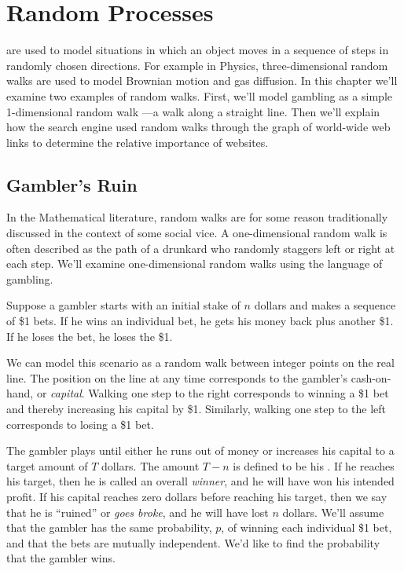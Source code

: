 \chapter{Random Processes}\label{ran_process_chap}

 are used to model situations in which an object moves
in a sequence of steps in randomly chosen directions.  For example in
Physics, three-dimensional random walks are used to model Brownian motion
and gas diffusion.  In this chapter we'll examine two examples of random
walks.  First, we'll model gambling as a simple 1-dimensional random walk
---a walk along a straight line.  Then we'll explain how the 
search engine used random walks through the graph of world-wide web links
to determine the relative importance of websites.

\section{Gambler's Ruin}

\begin{editingnotes}
In the Mathematical literature, random walks are for some reason
traditionally discussed in the context of some social vice.  A
one-dimensional random walk is often described as the path of a drunkard
who randomly staggers left or right at each step.  We'll examine
one-dimensional random walks using the language of gambling.
\end{editingnotes}

Suppose a gambler starts with an initial stake of $n$ dollars and
makes a sequence of \$1 bets.  If he wins an individual bet, he gets
his money back plus another \$1.  If he loses the bet, he loses the
\$1.

We can model this scenario as a random walk between integer points on
the real line.  The position on the line at any time corresponds to
the gambler's cash-on-hand, or \emph{capital}.  Walking one step to the
right corresponds to winning a \$1 bet and thereby increasing his
capital by \$1.  Similarly, walking one step to the left corresponds
to losing a \$1 bet.

The gambler plays until either he runs out of money or increases
his capital to a target amount of $T$ dollars.  The amount $T-n$ is
defined to be his .  If he reaches his target,
then he is called an overall \emph{winner}, and he will have won his
intended profit.  If his capital reaches zero dollars before reaching
his target, then we say that he is ``ruined'' or \emph{goes broke},
and he will have lost $n$ dollars.  We'll assume that the gambler has
the same probability, $p$, of winning each individual \$1 bet, and that
the bets are mutually independent.  We'd like to find the probability
that the gambler wins.

